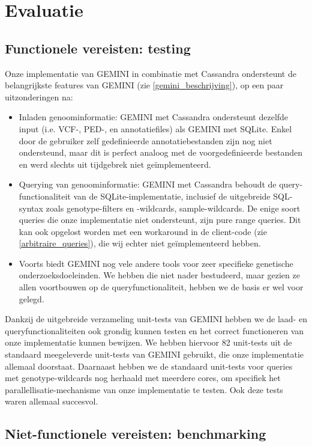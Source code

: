 \chapter{Evaluatie}
\label{evaluatie}

\section{Functionele vereisten: testing}

Onze implementatie van GEMINI in combinatie met Cassandra ondersteunt de belangrijkste features van GEMINI (zie \ref{gemini_beschrijving}), op een paar uitzonderingen na:
\begin{itemize}
\item Inladen genoominformatie: GEMINI met Cassandra ondersteunt dezelfde input (i.e. VCF-, PED-, en annotatiefiles) als GEMINI met SQLite. Enkel door de gebruiker zelf gedefinieerde annotatiebestanden zijn nog niet ondersteund, maar dit is perfect analoog met de voorgedefinieerde bestanden en werd slechts uit tijdgebrek niet ge\"implementeerd.
\item Querying van genoominformatie: GEMINI met Cassandra behoudt de query-functionaliteit van de SQLite-implementatie, inclusief de uitgebreide SQL-syntax zoals genotype-filters en -wildcards, sample-wildcards. De enige soort queries die onze implementatie niet ondersteunt, zijn pure range queries. Dit kan ook opgelost worden met een workaround in de client-code (zie \ref{arbitraire_queries}), die wij echter niet ge\"implementeerd hebben.
\item Voorts biedt GEMINI nog vele andere tools voor zeer specifieke genetische onderzoeksdoeleinden. We hebben die niet nader bestudeerd, maar gezien ze allen voortbouwen op de queryfunctionaliteit, hebben we de basis er wel voor gelegd.
\end{itemize}

Dankzij de uitgebreide verzameling unit-tests van GEMINI hebben we de laad- en queryfunctionaliteiten ook grondig kunnen testen en het correct functioneren van onze implementatie kunnen bewijzen. We hebben hiervoor 82 unit-tests uit de standaard meegeleverde unit-tests van GEMINI gebruikt, die onze implementatie allemaal doorstaat. Daarnaast hebben we de standaard unit-tests voor queries met genotype-wildcards nog herhaald met meerdere cores, om specifiek het parallellisatie-mechanisme van onze implementatie te testen. Ook deze tests waren allemaal succesvol.

\section{Niet-functionele vereisten: benchmarking}

